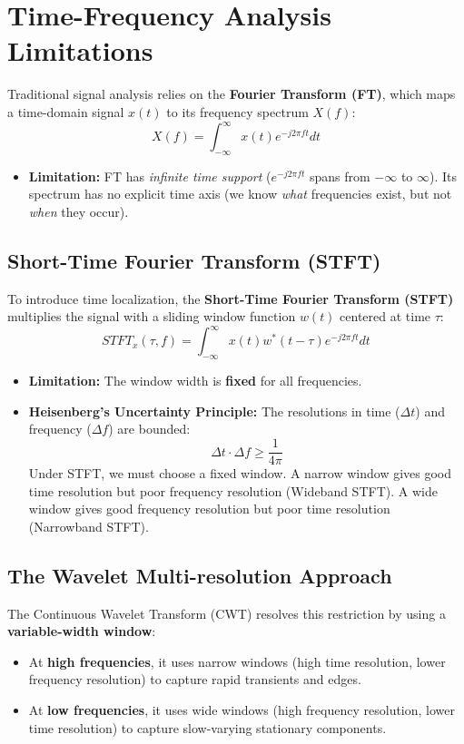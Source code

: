 \documentclass[12pt,a4paper]{article}
\begin{document}
\section{Time-Frequency Analysis Limitations}

Traditional signal analysis relies on the \textbf{Fourier Transform (FT)}, which maps a time-domain signal $x(t)$ to its frequency spectrum $X(f)$:
$$X(f) = \int_{-\infty}^{\infty} x(t) e^{-j 2\pi f t} dt$$

\begin{itemize}[leftmargin=*, itemsep=3.5pt]
  \item \textbf{Limitation:} FT has \textit{infinite time support} ($e^{-j 2\pi f t}$ spans from $-\infty$ to $\infty$). Its spectrum has no explicit time axis (we know \textit{what} frequencies exist, but not \textit{when} they occur).
\end{itemize}

\subsection{Short-Time Fourier Transform (STFT)}
To introduce time localization, the \textbf{Short-Time Fourier Transform (STFT)} multiplies the signal with a sliding window function $w(t)$ centered at time $\tau$:
$$STFT_x(\tau, f) = \int_{-\infty}^{\infty} x(t) w^*(t - \tau) e^{-j 2\pi f t} dt$$

\begin{itemize}[leftmargin=*, itemsep=3.5pt]
  \item \textbf{Limitation:} The window width is \textbf{fixed} for all frequencies. 
  \item \textbf{Heisenberg's Uncertainty Principle:} The resolutions in time ($\Delta t$) and frequency ($\Delta f$) are bounded:
  $$\Delta t \cdot \Delta f \ge \frac{1}{4\pi}$$
  Under STFT, we must choose a fixed window. A narrow window gives good time resolution but poor frequency resolution (Wideband STFT). A wide window gives good frequency resolution but poor time resolution (Narrowband STFT).
\end{itemize}

\subsection{The Wavelet Multi-resolution Approach}
The Continuous Wavelet Transform (CWT) resolves this restriction by using a \textbf{variable-width window}:
\begin{itemize}[leftmargin=*, itemsep=3.5pt]
  \item At \textbf{high frequencies}, it uses narrow windows (high time resolution, lower frequency resolution) to capture rapid transients and edges.
  \item At \textbf{low frequencies}, it uses wide windows (high frequency resolution, lower time resolution) to capture slow-varying stationary components.
\end{itemize}
\end{document}
